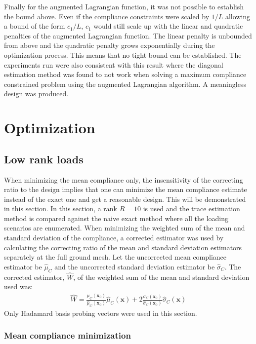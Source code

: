 Finally for the augmented Lagrangian function, it was not possible to establish the bound above. Even if the compliance constraints were scaled by $1/L$ allowing a bound of the form $c_1 / L$, $c_1$ would still scale up with the linear and quadratic penalties of the augmented Lagrangian function. The linear penalty is unbounded from above and the quadratic penalty grows exponentially during the optimization process. This means that no tight bound can be established. The experiments run were also consistent with this result where the diagonal estimation method was found to not work when solving a maximum compliance constrained problem using the augmented Lagrangian algorithm. A meaningless design was produced.

\section{Optimization}

\subsection{Low rank loads}

When minimizing the mean compliance only, the insensitivity of the correcting ratio to the design implies that one can minimize the mean compliance estimate instead of the exact one and get a reasonable design. This will be demonstrated in this section. In this section, a rank $R = 10$ is used and the trace estimation method is compared against the naive exact method where all the loading scenarios are enumerated. When minimizing the weighted sum of the mean and standard deviation of the compliance, a corrected estimator was used by calculating the correcting ratio of the mean and standard deviation estimators separately at the full ground mesh. Let the uncorrected mean compliance estimator be $\hat{\mu}_C$ and the uncorrected standard deviation estimator be $\hat{\sigma}_C$. The corrected estimator, $\hat{W}$, of the weighted sum of the mean and standard deviation used was:
\begin{align} \label{eqn:corrected_estimator}
 \hat{W} = \frac{\mu_C(\bm{x}_0)}{\hat{\mu}_C(\bm{x}_0)} \hat{\mu}_C(\bm{x}) + 2 \frac{\sigma_C(\bm{x}_0)}{\hat{\sigma}_C(\bm{x}_0)} \hat{\sigma}_C(\bm{x})
\end{align}
Only Hadamard basis probing vectors were used in this section.

\subsubsection{Mean compliance minimization}

